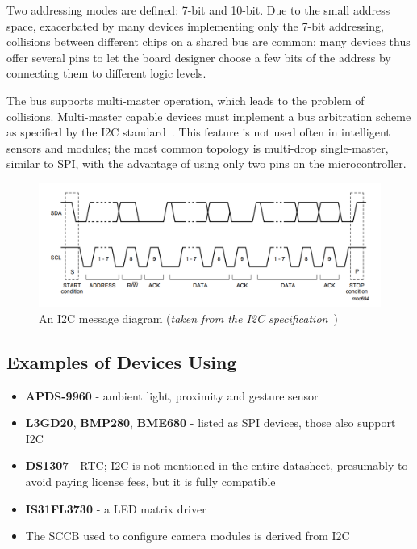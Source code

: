 Two addressing modes are defined: 7-bit and 10-bit. Due to the small address space, exacerbated by many devices implementing only the 7-bit addressing, collisions between different chips on a shared bus are common; many devices thus offer several pins to let the board designer choose a few bits of the address by connecting them to different logic levels.

The bus supports multi-master operation, which leads to the problem of collisions. Multi-master capable devices must implement a bus arbitration scheme as specified by the \gls{I2C} standard~\cite{i2c-spec}. This feature is not used often in intelligent sensors and modules; the most common topology is multi-drop single-master, similar to \gls{SPI}, with the advantage of using only two pins on the microcontroller.

\begin{figure}[h]
	\centering
	\includegraphics[width=.9\textwidth] {img/i2c-frame.png}
	\caption[\IIC message diagram]{\label{fig:i2c-frame}An \gls{I2C} message diagram (\textit{taken from the \gls{I2C} specification~\cite{i2c-spec}})}
\end{figure}

\subsection{Examples of Devices Using \IIC}

\begin{itemize}
	\item \textbf{APDS-9960} - ambient light, proximity and gesture sensor
	\item \textbf{L3GD20}, \textbf{BMP280}, \textbf{BME680} - listed as \gls{SPI} devices, those also support \gls{I2C}
	\item \textbf{DS1307} - \gls{RTC}; \gls{I2C} is not mentioned in the entire datasheet, presumably to avoid paying license fees, but it is fully compatible
	\item \textbf{IS31FL3730} - a \gls{LED} matrix driver
	\item The \gls{SCCB} used to configure camera modules is derived from \gls{I2C}
\end{itemize}

